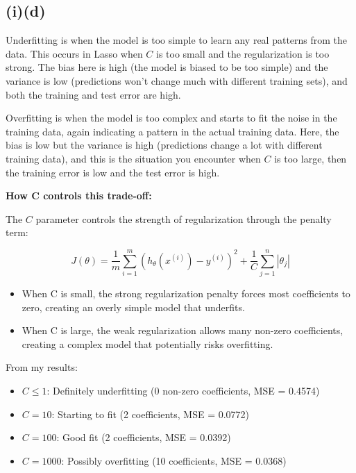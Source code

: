 \documentclass[11pt,a4paper]{article}
\begin{document}
\subsection*{(i)(d)}

Underfitting is when the model is too simple to learn any real patterns from the data. This occurs in Lasso when $C$ is too small and the regularization is too strong. The bias here is high (the model is biased to be too simple) and the variance is low (predictions won't change much with different training sets), and both the training and test error are high.

Overfitting is when the model is too complex and starts to fit the noise in the training data, again indicating a pattern in the actual training data. Here, the bias is low but the variance is high (predictions change a lot with different training data), and this is the situation you encounter when $C$ is too large, then the training error is low and the test error is high.

\textbf{How C controls this trade-off:}

The $C$ parameter controls the strength of regularization through the penalty term:

\begin{equation}
J(\theta) = \frac{1}{m} \sum_{i=1}^{m} (h_\theta(x^{(i)}) - y^{(i)})^2 + \frac{1}{C} \sum_{j=1}^{n} |\theta_j|
\end{equation}

\begin{itemize}
    \item When C is small, the strong regularization penalty forces most coefficients to zero, creating an overly simple model that underfits.
    \item When C is large, the weak regularization allows many non-zero coefficients, creating a complex model that potentially risks overfitting.
\end{itemize}

From my results:
\begin{itemize}
    \item $C \leq 1$: Definitely underfitting (0 non-zero coefficients, MSE = 0.4574)
    \item $C = 10$: Starting to fit (2 coefficients, MSE = 0.0772)
    \item $C = 100$: Good fit (2 coefficients, MSE = 0.0392)
    \item $C = 1000$: Possibly overfitting (10 coefficients, MSE = 0.0368)
\end{itemize}
\end{document}
